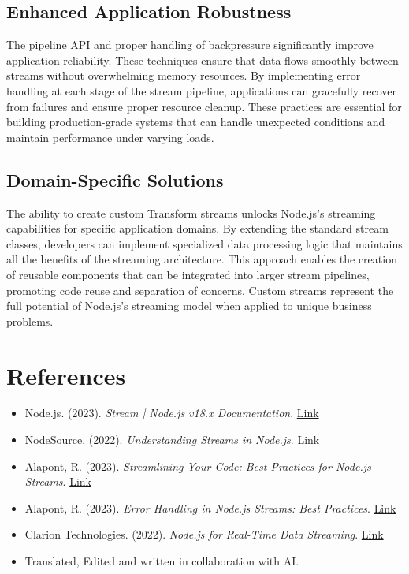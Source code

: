 \documentclass[12pt,letterpaper]{article}
\begin{document}
\subsection{Enhanced Application Robustness}

The pipeline API and proper handling of backpressure significantly improve application reliability. These techniques ensure that data flows smoothly between streams without overwhelming memory resources. By implementing error handling at each stage of the stream pipeline, applications can gracefully recover from failures and ensure proper resource cleanup. These practices are essential for building production-grade systems that can handle unexpected conditions and maintain performance under varying loads.

\subsection{Domain-Specific Solutions}

The ability to create custom Transform streams unlocks Node.js's streaming capabilities for specific application domains. By extending the standard stream classes, developers can implement specialized data processing logic that maintains all the benefits of the streaming architecture. This approach enables the creation of reusable components that can be integrated into larger stream pipelines, promoting code reuse and separation of concerns. Custom streams represent the full potential of Node.js's streaming model when applied to unique business problems.


\section{References}

\begin{itemize}
    \item Node.js. (2023). \textit{Stream | Node.js v18.x Documentation}. \href{https://nodejs.org/docs/latest-v18.x/api/stream.html}{Link}
    
    \item NodeSource. (2022). \textit{Understanding Streams in Node.js}. \href{https://nodesource.com/blog/understanding-streams-in-nodejs}{Link}
    
    \item Alapont, R. (2023). \textit{Streamlining Your Code: Best Practices for Node.js Streams}. \href{https://dev.to/ruben_alapont/streamlining-your-code-best-practices-for-nodejs-streams-1ji0}{Link}
    
    \item Alapont, R. (2023). \textit{Error Handling in Node.js Streams: Best Practices}. \href{https://dev.to/ruben_alapont/error-handling-in-nodejs-streams-best-practices-dhb}{Link}
    
    \item Clarion Technologies. (2022). \textit{Node.js for Real-Time Data Streaming}. \href{https://www.clariontech.com/blog/node.js-real-time-data-streaming}{Link}

    \item Translated, Edited and written in collaboration with AI.
\end{itemize}
\end{document}
